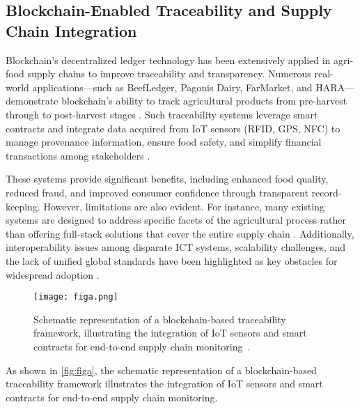 \documentclass[12pt,onecolumn]{IEEEtran} %
\begin{document}
  \subsection{Blockchain-Enabled Traceability and Supply Chain Integration}\label{subsec:lit-traceability}
Blockchain’s decentralized ledger technology has been extensively applied in agri-food supply chains to improve traceability and transparency. Numerous real-world applications—such as BeefLedger, Pagonis Dairy, FarMarket, and HARA—demonstrate blockchain’s ability to track agricultural products from pre-harvest through to post-harvest stages \cite{akella2023asystematicreview, mwewa2024blockchaintechnologya}. Such traceability systems leverage smart contracts and integrate data acquired from IoT sensors (RFID, GPS, NFC) to manage provenance information, ensure food safety, and simplify financial transactions among stakeholders \cite{ellahi2023blockchainbasedframeworksfor, akella2023asystematicreview}.

These systems provide significant benefits, including enhanced food quality, reduced fraud, and improved consumer confidence through transparent record-keeping. However, limitations are also evident. For instance, many existing systems are designed to address specific facets of the agricultural process rather than offering full-stack solutions that cover the entire supply chain \cite{akella2023asystematicreview}. Additionally, interoperability issues among disparate ICT systems, scalability challenges, and the lack of unified global standards have been highlighted as key obstacles for widespread adoption \cite{akella2023asystematicreview}. \begin{figure}[htbp]
  \centering
  \texttt{[image: figa.png]}
  \caption{Schematic representation of a blockchain-based traceability framework, illustrating the integration of IoT sensors and smart contracts for end-to-end supply chain monitoring~\cite{sakthivel2024enhancingtransparencyand}.}
  \label{fig:figa}
\end{figure}

As shown in \autoref{fig:figa}, the schematic representation of a blockchain-based traceability framework illustrates the integration of IoT sensors and smart contracts for end-to-end supply chain monitoring.
\end{document}
